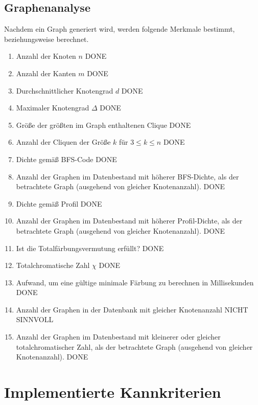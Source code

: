 \documentclass[13pt]{scrreprt}
\newcounter{tempcounter1}
\newcounter{tempcounter2}
\newcounter{tempcounter3}
\newcounter{tempcounter4}
\newcounter{tempcounter5}
\newcounter{tempcounter6}
\newcounter{tempcounter7}
\newcounter{tempcounter8}
\newcounter{tempcounter9}
\begin{document}
\section{Graphenanalyse}
\label{Graphenanalyse}
Nachdem ein Graph generiert wird, werden folgende Merkmale bestimmt, beziehungsweise berechnet. \\
\begin{addmargin}[25pt]{0pt}
	\begin{enumerate} [label=FA\arabic*,start=600]
		\label{FA6}
		\item Anzahl der Knoten $n$ DONE
		\item Anzahl der Kanten $m$ DONE
		\item Durchschnittlicher Knotengrad $d$ DONE
		\item Maximaler Knotengrad $\Delta$ DONE
		\item Größe der größten im Graph enthaltenen Clique DONE
		\item Anzahl der Cliquen der Größe $k$ für $3 \leq k \leq n$ DONE
		\item Dichte gemäß BFS-Code DONE
		\item Anzahl der Graphen im Datenbestand mit höherer BFS-Dichte, als der betrachtete Graph (ausgehend von gleicher Knotenanzahl). DONE
		\item Dichte gemäß Profil DONE
		\item Anzahl der Graphen im Datenbestand mit höherer Profil-Dichte, als der betrachtete Graph (ausgehend von gleicher Knotenanzahl). DONE
		\item Ist die Totalfärbungsvermutung erfüllt? DONE
		\item Totalchromatische Zahl $\chi$ DONE
		\item Aufwand, um eine gültige minimale Färbung zu berechnen in Millisekunden DONE
		\item Anzahl der Graphen in der Datenbank mit gleicher Knotenanzahl NICHT SINNVOLL
		\item Anzahl der Graphen im Datenbestand mit kleinerer oder gleicher totalchromatischer Zahl, als der betrachtete Graph (ausgehend von gleicher Knotenanzahl). DONE
		\setcounter{tempcounter8}{\value{enumi}}
	\end{enumerate}
\end{addmargin}

\chapter{Implementierte Kannkriterien}
\end{document}
